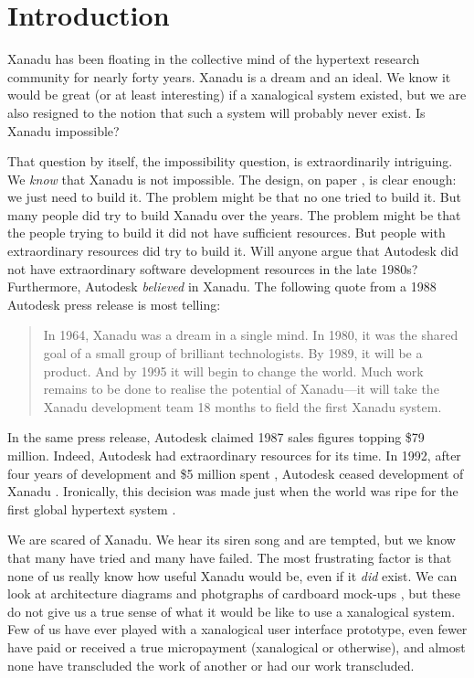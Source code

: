 \documentclass{acm_proc_article-sp}
\begin{document}
\section{Introduction}
Xanadu has been floating in the collective mind of the hypertext research community for nearly forty years.
Xanadu is a dream and an ideal.  
We know it would be great (or at least interesting) if a xanalogical system existed, but we are also resigned to the notion that such a system will probably never exist.
Is Xanadu impossible?

That question by itself, the impossibility question, is extraordinarily intriguing.  We {\it know} that Xanadu is not impossible.  
The design, on paper \cite{NelsonLiteraryMachines}, is clear enough:  we just need to build it.  
The problem might be that no one tried to build it.  
But many people did try to build Xanadu over the years.  
The problem might be that the people trying to build it did not have sufficient resources.  But people with extraordinary resources did try to build it.  
Will anyone argue that Autodesk did not have extraordinary software development resources in the late 1980s?  
Furthermore, Autodesk {\it believed} in Xanadu.  
The following quote from a 1988 Autodesk press release is most telling:

\begin{quote}
In 1964, Xanadu was a dream in a single mind.  In 1980, it was the
shared goal of a small group of brilliant technologists.  By 1989, it
will be a product.  And by 1995 it will begin to change the world.
Much work remains to be done to realise the potential of Xanadu---it
will take the Xanadu development team 18 months to field the first
Xanadu system. \cite{AutodeskPress} 
\end{quote}

In the same press release, Autodesk claimed 1987 sales figures topping \$79 million.  
Indeed, Autodesk had extraordinary resources for its time.  
In 1992, after four years of development and \$5 million spent \cite{AutodeskCost},  Autodesk ceased development of Xanadu \cite{AutodeskPressDrop}.  
Ironically, this decision was made just when the world was ripe for the first global hypertext system \cite{BernersLee92}.

We are scared of Xanadu.  
We hear its siren song and are tempted, but we know that many have tried and many have failed.  
The most frustrating factor is that none of us really know how useful Xanadu would be, even if it {\it did} exist.  
We can look at architecture diagrams and photgraphs of cardboard mock-ups \cite{Nelson1999}, but these do not give us a true sense of what it would be like to use a xanalogical system.  
Few of us have ever played with a xanalogical user interface prototype, even fewer have paid or received a true micropayment (xanalogical or otherwise), and almost none have transcluded the work of another or had our work transcluded.
\end{document}
